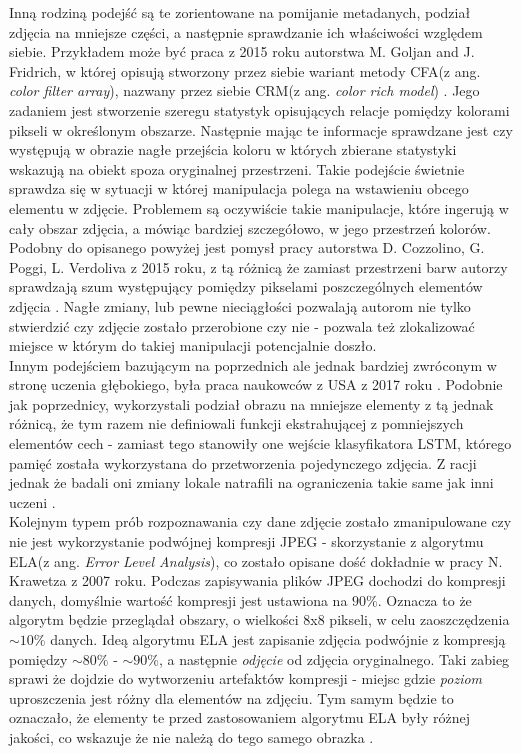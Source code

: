 Inną rodziną podejść są te zorientowane na pomijanie metadanych, podział zdjęcia na mniejsze części, a następnie sprawdzanie ich właściwości względem siebie. Przykładem może być praca z 2015 roku autorstwa  M. Goljan and J. Fridrich, w której opisują stworzony przez siebie wariant metody CFA(z ang. \textit{color filter array}), nazwany przez siebie CRM(z ang. \textit{color rich model}) \cite{goljan}. Jego zadaniem jest stworzenie szeregu statystyk opisujących relacje pomiędzy kolorami pikseli w określonym obszarze. Następnie mając te informacje sprawdzane jest czy występują w obrazie nagłe przejścia koloru w których zbierane statystyki wskazują na obiekt spoza oryginalnej przestrzeni. Takie podejście świetnie sprawdza się w sytuacji w której manipulacja polega na wstawieniu obcego elementu w zdjęcie. Problemem są oczywiście takie manipulacje, które ingerują w cały obszar zdjęcia, a mówiąc bardziej szczegółowo, w jego przestrzeń kolorów.\\

Podobny do opisanego powyżej jest pomysł pracy autorstwa D. Cozzolino, G. Poggi, L. Verdoliva z 2015 roku, z tą różnicą że zamiast przestrzeni barw autorzy sprawdzają szum występujący pomiędzy pikselami poszczególnych elementów zdjęcia \cite{poggi}. Nagłe zmiany, lub pewne nieciągłości pozwalają autorom nie tylko stwierdzić czy zdjęcie zostało przerobione czy nie - pozwala też zlokalizować miejsce w którym do takiej manipulacji potencjalnie doszło.\\

Innym podejściem bazującym na poprzednich ale jednak bardziej zwróconym w stronę uczenia głębokiego, była praca naukowców z USA z 2017 roku \cite{lstm}. Podobnie jak poprzednicy, wykorzystali podział obrazu na mniejsze elementy z tą jednak różnicą, że tym razem nie definiowali funkcji ekstrahującej z pomniejszych elementów cech - zamiast tego stanowiły one wejście klasyfikatora LSTM, którego pamięć została wykorzystana do przetworzenia pojedynczego zdjęcia. Z racji jednak że badali oni zmiany lokale natrafili na ograniczenia takie same jak inni uczeni \cite{goljan} \cite{poggi}.\\

Kolejnym typem prób rozpoznawania czy dane zdjęcie zostało zmanipulowane czy nie jest wykorzystanie podwójnej kompresji JPEG - skorzystanie z algorytmu ELA(z ang. \textit{Error Level Analysis}), co zostało opisane dość dokładnie w pracy N. Krawetza z 2007 roku\cite{hacker}. Podczas zapisywania plików JPEG dochodzi do kompresji danych, domyślnie wartość kompresji jest ustawiona na $90\%$. Oznacza to że algorytm będzie przeglądał obszary, o wielkości 8x8 pikseli, w celu zaoszczędzenia $\sim10\%$ danych. Ideą algorytmu ELA jest zapisanie zdjęcia podwójnie z kompresją pomiędzy $\sim80\%$ - $\sim90\%$, a następnie \textit{odjęcie} od zdjęcia oryginalnego. Taki zabieg sprawi że dojdzie do wytworzeniu artefaktów kompresji - miejsc gdzie \textit{poziom} uproszczenia jest różny dla elementów na zdjęciu. Tym samym będzie to oznaczało, że elementy te przed zastosowaniem algorytmu ELA były różnej jakości, co wskazuje że nie należą do tego samego obrazka \cite{oczko}.\\

